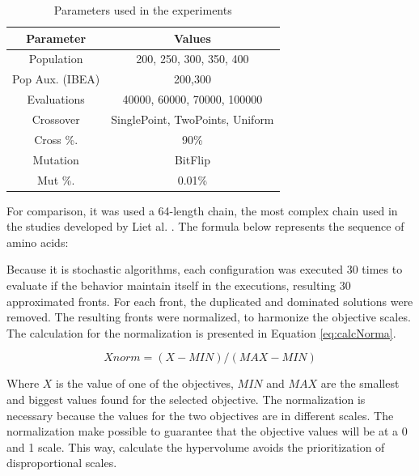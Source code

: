 \documentclass[conference]{IEEEtran}
\begin{document}
\begin{table}[h]
	\centering
	\caption{Parameters used in the experiments}
	\label{tab:tuning}
	\begin{tabular}{|c|c|}
		\hline
		{\bf Parameter} & {\bf Values}                 \\ \hline
		Population       & 200, 250, 300, 350, 400           \\
		\hline
		Pop Aux. (IBEA)        & 200,300                       \\ \hline
		Evaluations      & 40000, 60000, 70000, 100000      \\ \hline
		Crossover      & SinglePoint, TwoPoints, Uniform \\ \hline
		Cross \%.      & 90\%                          \\ \hline
		Mutation         & BitFlip                       \\ \hline
		Mut \%.       & 0.01\%                        \\ \hline
	\end{tabular}
\end{table}


For comparison, it was used a 64-length chain, the most complex chain used in the studies developed by Liet al. \cite{li2012genetic}. The formula below represents the sequence of amino acids:

\begin{center}
	\begin{small}
		\noindent {} 
	\end{small}
\end{center}

Because it is stochastic algorithms, each configuration was executed 30 times to evaluate if the behavior maintain itself in the executions, resulting 30 approximated fronts. For each front, the duplicated and dominated solutions were removed. The resulting fronts were normalized, to harmonize the objective scales. The calculation for the normalization is presented in Equation \ref{eq:calcNorma}.


\begin{equation} \label{eq:calcNorma}
	Xnorm = (X - MIN) / (MAX - MIN)
\end{equation}


Where $X$ is the value of one of the objectives, $MIN$ and $MAX$ are the smallest and biggest values found for the selected objective. The normalization is necessary because the values for the two objectives are in different scales. The normalization make possible to guarantee that the objective values will be at a 0 and 1 scale. This way, calculate the hypervolume avoids the prioritization of disproportional scales.
\end{document}

